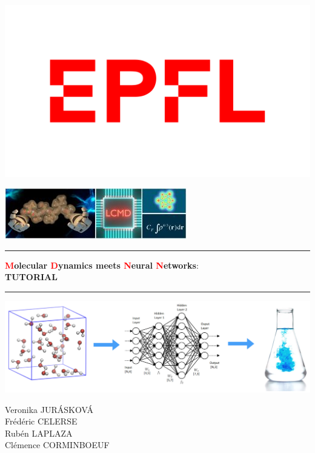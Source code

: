 \documentclass[12pt]{article}
\newcommand\Warning{%
 \makebox[1.4em][c]{%
 \makebox[0pt][c]{\raisebox{.1em}{\small!}}%
 \makebox[0pt][c]{\color{red}\Large$\bigtriangleup$}}}%
\begin{document}
\begin{minipage}[c]{0.5\linewidth}
\includegraphics[scale=0.2]{EPFL-logo.png}
\end{minipage}
\begin{minipage}[c]{0.5\linewidth}
\includegraphics[scale=0.75]{lcmd-logo.jpg}
\end{minipage}
\vspace{0.5cm}
\hrule 
\vspace{0.5cm}
\begin{center}
\LARGE \textbf{\textcolor{red}{M}olecular \textcolor{red}{D}ynamics meets \textcolor{red}{N}eural \textcolor{red}{N}etworks}: \\
\LARGE \textbf{TUTORIAL}
\vspace{0.5cm}
\\ %
\end{center}
\hrule 
\vspace{2cm}
\begin{center}
\includegraphics[scale=0.17]{Picture.jpeg}
\end{center}
\vspace{1cm}
\begin{center}
    Veronika JURÁSKOVÁ \\
    Frédéric CELERSE \\
    Rubén LAPLAZA \\
    Clémence CORMINBOEUF
\end{center}
 
\end{document}
